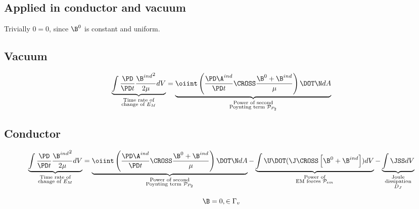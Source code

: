 \documentclass[11pt]{article}
\begin{document}
\subsection{Applied in conductor and vacuum}
Trivially $0 = 0$, since $\B^0$ is constant and uniform.
\subsection{Vacuum}
\begin{equation}
	\underbrace{\int \frac{\PD }{\PD t} \frac{{\B^{ind}}^2}{2 \mu} dV}_
	{\substack{\text{Time rate of}\\\text{change of $E_M$}}}
	=
	\underbrace{\oiint \left( \frac{\PD \A^{ind}}{\PD t} \CROSS \frac{\B^{0} + \B^{ind}}{\mu} \right)\DOT \N dA }_
	{\substack{\text{Power of second}\\\text{Poynting term $\mathcal P_{P_2}$}}}
\end{equation}
\subsection{Conductor}
\begin{equation}
	\underbrace{\int \frac{\PD }{\PD t} \frac{{\B^{ind}}^2}{2 \mu} dV}_
	{\substack{\text{Time rate of}\\\text{change of $E_M$}}}
	=
	\underbrace{\oiint \left( \frac{\PD \A^{ind}}{\PD t} \CROSS \frac{\B^{0} + \B^{ind}}{\mu} \right)\DOT \N dA }_
	{\substack{\text{Power of second}\\\text{Poynting term $\mathcal P_{P_2}$}}}
	- \underbrace{\int \U \DOT (\J \CROSS \left[ \B^0 + \B^{ind} \right]) dV}_
	{\substack{\text{Power of}\\\text{EM forces $\mathcal P_{em}$}}}
	- \underbrace{\int \JSS dV}_
	{\substack{\text{Joule}\\\text{dissipation}\\\text{$D_J$}}}
\end{equation}

\begin{equation}
	\B = 0, \in \Gamma_v
\end{equation}
\end{document}
